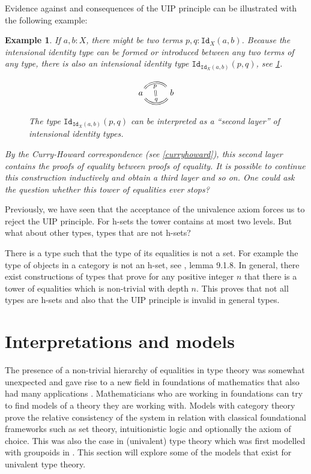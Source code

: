 \documentclass[12pt,a4paper,twoside,xetex,draft]{book}
\newtheorem{example}[theorem]{Example}
\newcommand{\op}[1]{\mathtt{#1}}
\begin{document}
Evidence against and consequences of the UIP principle can be illustrated with the following example:

\begin{example}\label{stackedeqs}
If $a,b:X$, there might be two terms $p,q:\op{Id}_X(a,b)$. Because the intensional identity type can be formed or introduced between any two terms of any type, there is also an intensional identity type $\op{Id}_{\op{Id}_X(a,b)}(p,q)$, see \cref{secondleveleq}. 


\begin{figure}\label{secondleveleq}
 \centering
 
\[ \begin{tikzcd}
a \arrow[equal, r, bend left=50, "p"{name=U, below}]
\arrow[equal, r, bend right=50, "q"{name=D}]
& b
\arrow[equal, r, from=U, to=D]
\end{tikzcd}
\]
 \caption{The type $\op{Id}_{\op{Id}_X(a,b)}(p,q)$ can be interpreted as a ``second layer'' of intensional identity types. }
\end{figure}


By the Curry-Howard correspondence (see \cref{curryhoward}), this second layer contains the proofs of equality between proofs of equality. It is possible to continue this construction inductively and obtain a third layer and so on. One could ask the question whether this tower of equalities ever stops? 
\end{example}




Previously, we have seen that the acceptance of the univalence axiom forces us to reject the UIP principle. For h-sets the tower contains at most two levels. But what about other types, types that are not h-sets? 

There is a type such that the type of its equalities is not a set. For example the type of objects in a category is not an h-set, see \cite{Voevodsky2013}, lemma 9.1.8. In general, there exist constructions of types that prove for any positive integer $n$ that there is a tower of equalities which is non-trivial with depth $n$. This proves that not all types are h-sets and also that the UIP principle is invalid in general types. 



\chapter{Interpretations and models}

The presence of a non-trivial hierarchy of equalities in type theory was somewhat unexpected and gave rise to a new field in foundations of mathematics that also had many applications \cite{Voevodsky2013}. Mathematicians who are working in foundations can try to find models of a theory they are working with. Models with category theory prove the relative consistency of the system in relation with classical foundational frameworks such as set theory, intuitionistic logic and optionally the axiom of choice. This was also the case in (univalent) type theory which was first modelled with groupoids in \cite{Hofmann1998}. This section will explore some of the models that exist for univalent type theory.
\end{document}
